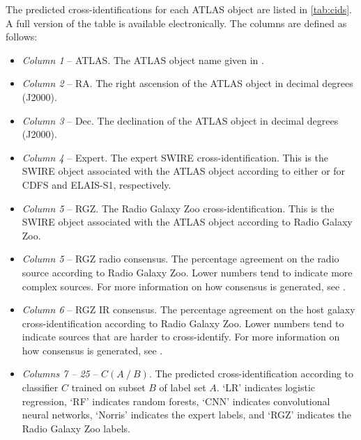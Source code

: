 \documentclass[fleqn,usenatbib,usedcolumn]{mnras}
\begin{document}
  The predicted cross-identifications for each ATLAS object are listed in
  \autoref{tab:cids}. A full version of the table is available electronically.
  The columns are defined as follows:
  \begin{itemize}
    \item {\em Column 1}  -- ATLAS. The ATLAS object name given in \citet{franzen15}.
    \item {\em Column 2} -- RA. The right ascension of the ATLAS object in decimal degrees (J2000).
    \item {\em Column 3} -- Dec. The declination of the ATLAS object in decimal degrees (J2000).
    \item {\em Column 4} -- Expert. The expert SWIRE cross-identification.
      This is the SWIRE object associated with the ATLAS object according to
      either \citet{norris06} or \citet{middelberg08} for CDFS and ELAIS-S1,
      respectively.
    \item {\em Column 5} -- RGZ. The Radio Galaxy Zoo cross-identification.
      This is the SWIRE object associated with the ATLAS object according to
      Radio Galaxy Zoo.
    \item {\em Column 5} -- RGZ radio consensus. The percentage agreement on
      the radio source according to Radio Galaxy Zoo. Lower numbers tend to
      indicate more complex sources. For more information on how consensus is
      generated, see \citet{wong17}.
    \item {\em Column 6} -- RGZ IR consensus. The percentage agreement on
      the host galaxy cross-identification according to Radio Galaxy Zoo.
      Lower numbers tend to indicate sources that are harder to
      cross-identify. For more information on how consensus is generated, see
      \citet{wong17}.
    \item {\em Columns 7 -- 25} -- $C(A\ /\ B)$. The predicted
      cross-identification according to classifier $C$ trained on subset $B$
      of label set $A$. `LR' indicates logistic regression, `RF' indicates
      random forests, `CNN' indicates convolutional neural networks, `Norris'
      indicates the expert labels, and `RGZ' indicates the Radio Galaxy Zoo
      labels.
  \end{itemize}

\bsp	%
\label{lastpage}
\end{document}
